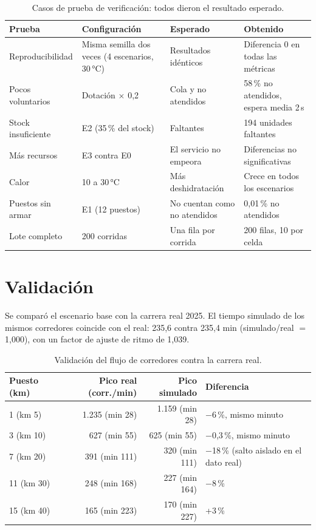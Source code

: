 \documentclass[11pt,a4paper]{article}
\begin{document}
\begin{table}[H]
\centering
\small
\begin{tabular}{P{2.8cm}P{4cm}P{3.6cm}P{4.4cm}}
\toprule
\textbf{Prueba} & \textbf{Configuración} & \textbf{Esperado} & \textbf{Obtenido} \\
\midrule
Reproducibilidad & Misma semilla dos veces (4 escenarios, 30\,°C) & Resultados idénticos & Diferencia 0 en todas las métricas \\
Pocos voluntarios & Dotación $\times$ 0,2 & Cola y no atendidos & 58\,\% no atendidos, espera media 2\,s \\
Stock insuficiente & E2 (35\,\% del stock) & Faltantes & 194 unidades faltantes \\
Más recursos & E3 contra E0 & El servicio no empeora & Diferencias no significativas \\
Calor & 10 a 30\,°C & Más deshidratación & Crece en todos los escenarios \\
Puestos sin armar & E1 (12 puestos) & No cuentan como no atendidos & 0,01\,\% no atendidos \\
Lote completo & 200 corridas & Una fila por corrida & 200 filas, 10 por celda \\
\bottomrule
\end{tabular}
\caption{Casos de prueba de verificación: todos dieron el resultado esperado.}
\end{table}

\section{Validación}

Se comparó el escenario base con la carrera real 2025. El tiempo simulado de los mismos corredores coincide con el real: 235,6 contra 235,4 min (simulado/real $=$ 1,000), con un factor de ajuste de ritmo de 1,039.

\begin{table}[H]
\centering
\small
\begin{tabular}{lrrl}
\toprule
\textbf{Puesto (km)} & \textbf{Pico real (corr./min)} & \textbf{Pico simulado} & \textbf{Diferencia} \\
\midrule
1 (km 5) & 1.235 (min 28) & 1.159 (min 28) & $-$6\,\%, mismo minuto \\
3 (km 10) & 627 (min 55) & 625 (min 55) & $-$0,3\,\%, mismo minuto \\
7 (km 20) & 391 (min 111) & 320 (min 111) & $-$18\,\% (salto aislado en el dato real) \\
11 (km 30) & 248 (min 168) & 227 (min 164) & $-$8\,\% \\
15 (km 40) & 165 (min 223) & 170 (min 227) & +3\,\% \\
\bottomrule
\end{tabular}
\caption{Validación del flujo de corredores contra la carrera real.}
\end{table}
\end{document}

